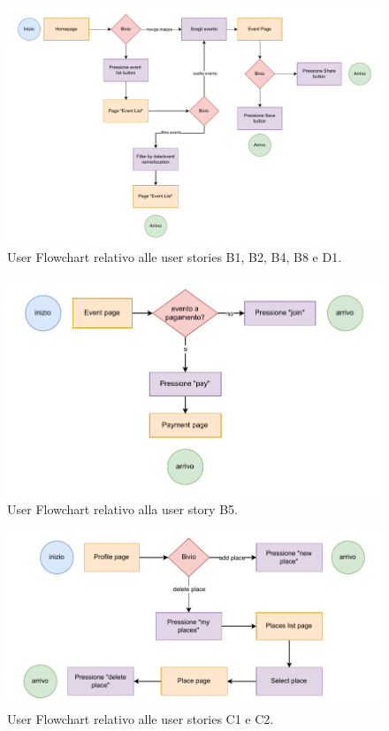 \documentclass[9pt]{extarticle}
\begin{document}
\newpage 

\begin{figure}[!htb]
	\centering
	\includegraphics[width=\linewidth]{./images/B1-B2-B4-B8-D1.pdf}
	\caption{User Flowchart relativo alle user stories B1, B2, B4, B8 e D1.}
	\label{fig:B1-C1}
\end{figure}


\begin{figure}[!htb]
	\centering
	\includegraphics[width=0.8\linewidth]{./images/B5.pdf}
	\caption{User Flowchart relativo alla user story B5.}
	\label{fig:B5}
\end{figure}

\newpage  

\begin{figure}[!htb]
	\centering
	\includegraphics[width=0.8\linewidth]{./images/C1-C2.pdf}
	\caption{User Flowchart relativo alle user stories C1 e C2.}
	\label{fig:C1-C2}
\end{figure}
\end{document}
